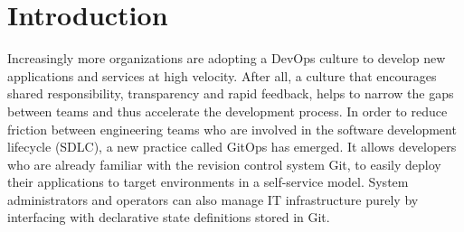 \chapter{Introduction}







Increasingly more organizations are adopting 
a DevOps culture to develop new applications and services at high velocity. 
After all, a culture that encourages shared responsibility, transparency and rapid feedback, 
helps to narrow the gaps between teams and thus accelerate the development process.
In order to
reduce friction between engineering teams who are involved in the software development lifecycle (SDLC),
a new practice called GitOps has emerged.
It allows developers who are already familiar with the revision control system Git,
to easily deploy their applications to target environments in a self-service model.
System administrators and operators can also manage IT infrastructure
purely by interfacing with declarative state definitions stored in Git.
\bigskip


